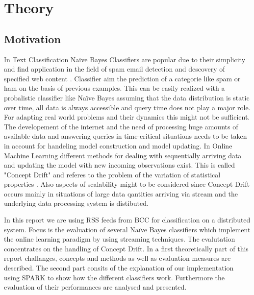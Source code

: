 \documentclass[12pt]{article}
\begin{document}


\renewcommand{\contentsname}{Table of Contents}
\tableofcontents

\newpage



\section{Theory}
\subsection{Motivation}
\begin{spacing}{1.2}
In Text Classification Na\"ive Bayes Classifiers are popular due to their simplicity and find application in the field of spam email detection and descovery of specified web content \citep[p. 225]{ertel2008}. Classifier aim the prediction of a categorie like spam or ham on the basis of previous examples. This can be easily realized with a probalistic classifier like Na\"ive Bayes assuming that the data distribution is static over time, all data is always accessible and query time does not play a major role. For adapting real world problems and their dynamics this might not be sufficient. The developement of the internet and the need of processing huge amounts of available data and answering queries in time-critical situations needs to be taken in account for handeling model construction and model updating. In Online Machine Learning different methods for dealing with sequentially arriving data and updating the model with new incoming observations exist. This is called "Concept Drift" and referes to the problem of the variation of statistical properties \citep{astudillo2013}. Also aspects of scalability might to be considered since Concept Drift occurs mainly in situations of large data qantities arriving via stream \citep[p. 4]{tsymbal2004} and the underlying data processing system is distibuted.   

In this report we are using RSS feeds from BCC for classification on a distributed system. Focus is the evaluation of several Na\"ive Bayes classifiers which implement the online learning paradigm by using streaming techniques.  The evalutation concentrates on the handling of Concept Drift. In a first theoretically part of this report challanges, concepts and methods as well as evaluation measures are described. The second part consits of the explanation of our implementation using SPARK to show how the different classifiers work. Furthermore the evaluation of their performances are analysed and presented.


\end{spacing}
\end{document}
